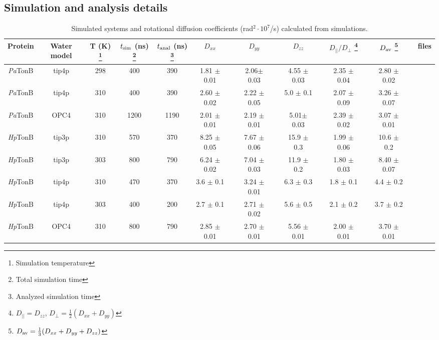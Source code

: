 \documentclass[pre,aps,floatfix,authordate1-4,twocolumn]{revtex4-1}
\begin{document}
\subsection{Simulation and analysis details}
\begin{table}[htb]
\centering
\caption{Simulated systems and rotational diffusion coefficients (rad$^2\cdot 10^7$/s) calculated from simulations.
}\label{ROTdiffCOEFFS}
\begin{tabular}{c c c c c c c c c c c c c c c c}
Protein     & Water model & T (K) \footnote{Simulation temperature}  &  $t_{\rm sim}$ (ns) \footnote{Total simulation time}  &  $t_{\rm anal}$ (ns) \footnote{Analyzed simulation time}  & $D_{xx}$ &&$D_{yy}$ &&$D_{zz}$ &&$D_{||}/D_\perp$ \footnote{$D_{||}=D_{zz}$, $D_\perp=\frac{1}{2}(D_{xx}+D_{yy})$} & &$D_{\rm av}$ \footnote{$D_{\rm av}=\frac{1}{3}(D_{xx}+D_{yy}+D_{zz} )$}& &files \\
\hline
{\it Pa}TonB      & tip4p       & 298    & 400                 &  390                 & 1.81 $\pm$ 0.01 && 2.06$\pm$ 0.03 && 4.55 $\pm$ 0.03 && 2.35 $\pm$ 0.04 && 2.80 $\pm$ 0.02 && \cite{??} \\
{\it Pa}TonB      & tip4p       & 310    & 400                 &  390                 &  2.60 $\pm$ 0.02 &&  2.22 $\pm$ 0.05& &  5.0  $\pm$ 0.1  & &  2.07 $\pm$ 0.09& &   3.26 $\pm$  0.07 && \cite{??}\\
{\it Pa}TonB      & OPC4        & 310    & 1200                &  1190                &  2.01 $\pm$ 0.01 && 2.19 $\pm$ 0.01 && 5.01$\pm$ 0.03 && 2.39 $\pm$ 0.02 && 3.07 $\pm$ 0.01 && \cite{??}  \\
{\it Hp}TonB      & tip3p       & 310    & 570           	 &  370                 & 8.25 $\pm$ 0.05 && 7.67 $\pm$ 0.06 && 15.9 $\pm$ 0.3 && 1.99 $\pm$ 0.06 &&  10.6 $\pm$ 0.2 &&  \cite{??} \\
{\it Hp}TonB      & tip3p       & 303    & 800           	 &  790                 & 6.24 $\pm$ 0.02 && 7.04 $\pm$ 0.03 && 11.9 $\pm$ 0.2 && 1.80 $\pm$ 0.03 && 8.40 $\pm$ 0.07 && \cite{??} \\
{\it Hp}TonB      & tip4p       & 310    & 470           	 &  370                 & 3.6 $\pm$ 0.1 && 3.24 $\pm$ 0.01 && 6.3 $\pm$ 0.3 && 1.8 $\pm$ 0.1 && 4.4 $\pm$ 0.2 && \cite{??} \\
{\it Hp}TonB      & tip4p       & 303    & 400           	 &  200                 & 2.7 $\pm$ 0.1 && 2.71 $\pm$ 0.02 && 5.6 $\pm$ 0.5 && 2.1 $\pm$ 0.2 && 3.7 $\pm$ 0.2 && \cite{??} \\
{\it Hp}TonB      & OPC4        & 310    & 800           	 &  790                 & 2.85 $\pm$ 0.01 && 2.70 $\pm$ 0.01 && 5.56 $\pm$ 0.01 && 2.00 $\pm$ 0.01 && 3.70 $\pm$ 0.01 && \cite{??} \\
\end{tabular}
\end{table}
\end{document}
